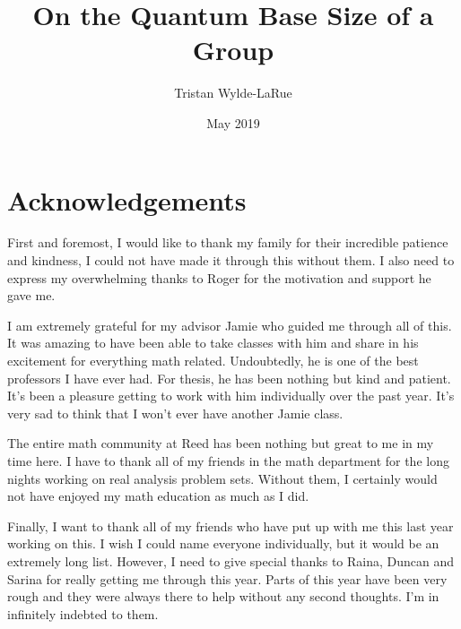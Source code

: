 
\title{On the Quantum Base Size of a Group}
\author{Tristan Wylde-LaRue}
\date{May 2019}






  \maketitle
  \frontmatter %
  \pagestyle{empty} %

    \chapter*{Acknowledgements}
    First and foremost, I would like to thank my family for their incredible patience and kindness, I could not 
    have made it through this without them. I also need to express my overwhelming thanks to Roger for the 
    motivation and support he gave me.

    I am extremely grateful for my advisor Jamie who guided me through all of this. It was amazing to have been 
    able to take classes with him and share in his excitement for everything math related. Undoubtedly, he is one 
    of the best professors I have ever had. For thesis, he has been nothing but kind and patient. It's been a 
    pleasure getting to work with him individually over the past year. It's very sad to think that I won't ever 
    have another Jamie class.

    The entire math community at Reed has been nothing but great to me in my time here. I have to thank all of my 
    friends in the math department for the long nights working on real analysis problem sets. Without them, I 
    certainly would not have enjoyed my math education as much as I did.

    Finally, I want to thank all of my friends who have put up with me this last year working on this. I wish I 
    could name everyone individually, but it would be an extremely long list. However, I need to give special 
    thanks to Raina, Duncan and Sarina for really getting me through this year. Parts of this year have been very 
    rough and they were always there to help without any second thoughts. I'm in infinitely indebted to them.


